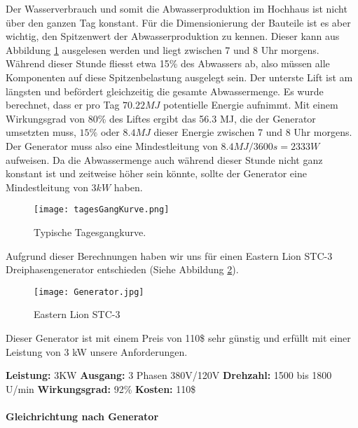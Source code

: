 Der Wasserverbrauch und somit die Abwasserproduktion im Hochhaus ist nicht über den ganzen Tag konstant. Für die Dimensionierung der Bauteile ist es aber wichtig, den Spitzenwert der Abwasserproduktion zu kennen. Dieser kann aus Abbildung \ref{fig:tagesGangKurve} ausgelesen werden und liegt zwischen 7 und 8 Uhr morgens. Während dieser Stunde fliesst etwa 15\% des Abwassers ab, also müssen alle Komponenten auf diese Spitzenbelastung ausgelegt sein. 
Der unterste Lift ist am längsten und befördert gleichzeitig die gesamte Abwassermenge. Es wurde berechnet, dass er pro Tag \(70.22 MJ\) potentielle Energie aufnimmt. Mit einem Wirkungsgrad von 80\% des Liftes ergibt das 56.3 MJ, die der Generator umsetzten muss, \(15\%\) oder \(8.4 MJ\) dieser Energie zwischen 7 und 8 Uhr morgens. Der Generator muss also eine Mindestleitung von \(8.4 MJ / 3600 s = 2333 W \) aufweisen. Da die Abwassermenge auch während dieser Stunde nicht ganz konstant ist und zeitweise höher sein könnte, sollte der Generator eine Mindestleitung von \(3 kW\) haben.

\begin{figure}[H]
\centering
\texttt{[image: tagesGangKurve.png]}
\caption{Typische Tagesgangkurve. \cite{peakWaterDemand}}
\label{fig:tagesGangKurve}
\end{figure}

Aufgrund dieser Berechnungen haben wir uns für einen Eastern Lion STC-3 Dreiphasengenerator entschieden (Siehe Abbildung \ref{fig:Generator}).  

\begin{figure}[H]
\centering
\texttt{[image: Generator.jpg]}
\caption{Eastern Lion STC-3 \cite{generator}}
\label{fig:Generator}
\end{figure}

Dieser Generator ist mit einem Preis von 110\$ sehr günstig und erfüllt mit einer Leistung von 3 kW unsere Anforderungen.

\textbf{Leistung:}		3KW \newline
\textbf{Ausgang:}		3 Phasen 380V/120V \newline
\textbf{Drehzahl:}		1500 bis 1800 U/min \newline
\textbf{Wirkungsgrad:}	92\% \newline
\textbf{Kosten:}		110\$ \newline

\paragraph{Gleichrichtung nach Generator}

